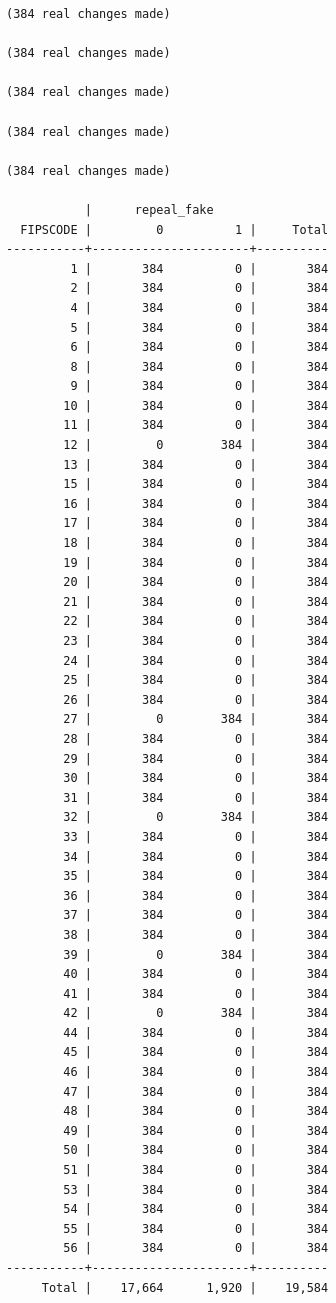 \documentclass[
]{book}
\begin{document}
\begin{verbatim}
(384 real changes made)

(384 real changes made)

(384 real changes made)

(384 real changes made)

(384 real changes made)

           |      repeal_fake
  FIPSCODE |         0          1 |     Total
-----------+----------------------+----------
         1 |       384          0 |       384 
         2 |       384          0 |       384 
         4 |       384          0 |       384 
         5 |       384          0 |       384 
         6 |       384          0 |       384 
         8 |       384          0 |       384 
         9 |       384          0 |       384 
        10 |       384          0 |       384 
        11 |       384          0 |       384 
        12 |         0        384 |       384 
        13 |       384          0 |       384 
        15 |       384          0 |       384 
        16 |       384          0 |       384 
        17 |       384          0 |       384 
        18 |       384          0 |       384 
        19 |       384          0 |       384 
        20 |       384          0 |       384 
        21 |       384          0 |       384 
        22 |       384          0 |       384 
        23 |       384          0 |       384 
        24 |       384          0 |       384 
        25 |       384          0 |       384 
        26 |       384          0 |       384 
        27 |         0        384 |       384 
        28 |       384          0 |       384 
        29 |       384          0 |       384 
        30 |       384          0 |       384 
        31 |       384          0 |       384 
        32 |         0        384 |       384 
        33 |       384          0 |       384 
        34 |       384          0 |       384 
        35 |       384          0 |       384 
        36 |       384          0 |       384 
        37 |       384          0 |       384 
        38 |       384          0 |       384 
        39 |         0        384 |       384 
        40 |       384          0 |       384 
        41 |       384          0 |       384 
        42 |         0        384 |       384 
        44 |       384          0 |       384 
        45 |       384          0 |       384 
        46 |       384          0 |       384 
        47 |       384          0 |       384 
        48 |       384          0 |       384 
        49 |       384          0 |       384 
        50 |       384          0 |       384 
        51 |       384          0 |       384 
        53 |       384          0 |       384 
        54 |       384          0 |       384 
        55 |       384          0 |       384 
        56 |       384          0 |       384 
-----------+----------------------+----------
     Total |    17,664      1,920 |    19,584 


\end{verbatim}
\end{document}
